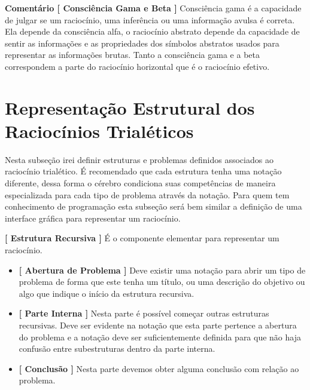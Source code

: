 \documentclass[10pt,a4paper]{report}
\begin{document}
\textbf{Comentário [ Consciência Gama e Beta ]} Consciência gama é a capacidade de julgar se um raciocínio, uma inferência ou uma informação avulsa é correta. Ela depende da consciência alfa, o raciocínio abstrato depende da capacidade de sentir as informações e as propriedades dos símbolos abstratos usados para representar as informações brutas. Tanto a consciência gama e a beta correspondem a parte do raciocínio horizontal que é o raciocínio efetivo.




\section{Representação Estrutural dos Raciocínios Trialéticos}

\hspace{\baselineskip}

Nesta subseção irei definir estruturas e problemas definidos associados ao raciocínio trialético. É recomendado que cada estrutura tenha uma notação diferente, dessa forma o cérebro condiciona suas competências de maneira especializada para cada tipo de problema através da notação. Para quem tem conhecimento de programação esta subseção será bem similar a definição de uma interface gráfica para representar um raciocínio.

\hspace{\baselineskip}

\textbf{[ Estrutura Recursiva ]} É o componente elementar para representar um raciocínio.

\begin{itemize}
	\item[ (i) ] \textbf{[ Abertura de Problema ]} Deve existir uma notação para abrir um tipo de problema de forma que este tenha um título, ou uma descrição do objetivo ou algo que indique o início da estrutura recursiva.
	\item[ (ii) ] \textbf{[ Parte Interna ]} Nesta parte é possível começar outras estruturas recursivas. Deve ser evidente na notação que esta parte pertence a abertura do problema e a notação deve ser suficientemente definida para que não haja confusão entre subestruturas dentro da parte interna.
	\item[ (iii) ] \textbf{[ Conclusão ]} Nesta parte devemos obter alguma conclusão com relação ao problema.
\end{itemize}
\end{document}
